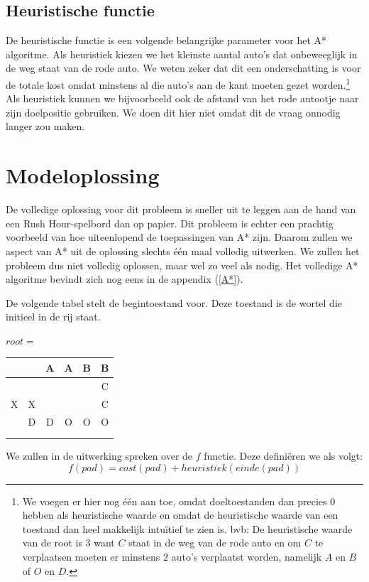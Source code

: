 \documentclass[alternative-exam.tex]{subfiles}
\begin{document}
\subsection{Heuristische functie} De heuristische functie is een volgende belangrijke parameter voor het A* algoritme. Als heuristiek kiezen we het kleinste aantal auto's dat onbeweeglijk in de weg staat van de rode auto. We weten zeker dat dit een onderschatting is voor de totale kost omdat minstens al die auto's aan de kant moeten gezet worden.\footnote{We voegen er hier nog \'e\'en aan toe, omdat doeltoestanden dan precies $0$ hebben als heuristische waarde en omdat de heuristische waarde van een toestand dan heel makkelijk intu\"itief te zien is. bvb: De heuristische waarde van de root is $3$ want $C$ staat in de weg van de rode auto en om $C$ te verplaatsen moeten er minstens $2$ auto's verplaatst worden, namelijk $A$ en $B$ of $O$ en $D$.}
Als heuristiek kunnen we bijvoorbeeld ook de afstand van het rode autootje naar zijn doelpositie gebruiken. We doen dit hier niet omdat dit de vraag onnodig langer zou maken.

\section{Modeloplossing}
De volledige oplossing voor dit probleem is sneller uit te leggen aan de hand van een Rush Hour-spelbord dan op papier. Dit probleem is echter een prachtig voorbeeld van hoe uiteenlopend de toepassingen van A* zijn. Daarom zullen we aspect van A* uit de oplossing slechts \'e\'en maal volledig uitwerken. We zullen het probleem dus niet volledig oplossen, maar wel zo veel als nodig. Het volledige A* algoritme bevindt zich nog eens in de appendix (\ref{A*}).

De volgende tabel stelt de begintoestand voor. Deze toestand is de wortel die initieel in de rij staat.
\begin{center}
$root = $
\begin{tabular}{| c | c | c | c | c | c |}
\hline
   &   & A & A & B & B \\ \hline
   &   &   &   &   & C \\ \hline
 X & X &   &   &   & C \\ \hline
   & D & D & O & O & O \\ \hline
   &   &   &   &   &   \\ \hline
   &   &   &   &   &   \\
\hline
\end{tabular}
\end{center}
We zullen in de uitwerking spreken over de $f$ functie. Deze defini\"eren we als volgt:
\[
f(pad) = cost(pad) + heuristiek(einde(pad))
\]
\end{document}

